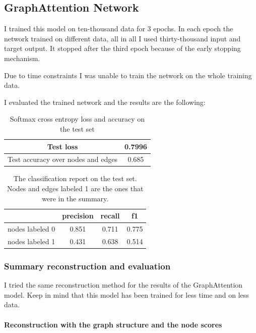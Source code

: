\subsection{GraphAttention Network}

I trained this model on ten-thousand data for 3 epochs. In each epoch the network trained on different data, all in all I used thirty-thousand input and target output. It stopped after the third epoch because of the early stopping mechanism.

Due to time constraints I was unable to train the network on the whole training data.

I evaluated the trained network and the results are the following:

\begin{table}[!h]
	\centering
	\begin{tabular}{| c | c |}
		\hline
		Test loss & 0.7996 \\ \hline
		Test accuracy over nodes and edges& 0.685 \\ \hline
	\end{tabular}
	\caption{Softmax cross entropy loss and accuracy on the test set}
\end{table}

\begin{table}[!h]
	\centering
	\begin{tabular}{| c | c | c | c |}
		\hline
		& precision & recall & f1 \\ \hline \hline
		nodes labeled 0 & 0.851 & 0.711 & 0.775 \\ \hline
		nodes labeled 1 & 0.431 & 0.638 & 0.514 \\ \hline
	\end{tabular}
	\caption{The classification report on the test set. Nodes and edges labeled 1 are the ones that were in the summary.}
\end{table}

\subsubsection{Summary reconstruction and evaluation}
I tried the same reconstruction method for the results of the GraphAttention model. Keep in mind that this model has been trained for less time and on less data.

\paragraph{Reconstruction with the graph structure and the node scores}

